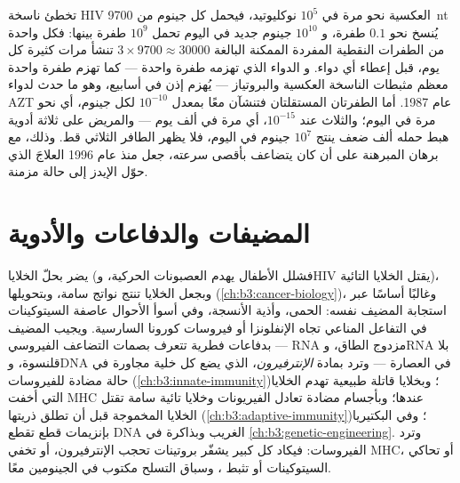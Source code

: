 \begin{example}\label{ex:b3:virology:three-drugs}
تخطئ ناسخة HIV العكسية نحو مرة في $10^{5}$ نوكليوتيد، فيحمل
كل جينوم من \qty{9700}{nt} يُنسخ نحو $0.1$ طفرة، و
$10^{10}$ جينوم جديد في اليوم تحمل $10^{9}$ طفرة بينها: فكل
واحدة من الطفرات النقطية المفردة الممكنة البالغة $3\times 9700 \approx \num{30000}$
تنشأ مرات كثيرة كل يوم، قبل إعطاء أي دواء. و
الدواء الذي تهزمه طفرة واحدة --- كما تهزم طفرة واحدة معظم
مثبطات الناسخة العكسية والبروتياز --- يُهزم إذن
في أسابيع، وهو ما حدث لدواء AZT عام 1987. أما الطفرتان المستقلتان
فتنشآن معًا بمعدل $10^{-10}$ لكل جينوم، أي نحو مرة في اليوم؛
والثلاث عند $10^{-15}$، أي مرة في ألف يوم --- والمريض على ثلاثة
أدوية هبط حمله ألف ضعف ينتج $10^{7}$ جينوم في
اليوم، فلا يظهر الطافر الثلاثي قط. وذلك، مع
برهان المبرهنة على أن  كان يتضاعف بأقصى سرعته، جعل
 منذ عام 1996 العلاجَ الذي حوّل الإيدز إلى
حالة مزمنة.
\end{example}

\section{المضيفات والدفاعات والأدوية}

\begin{proposition}\label{prop:b3:virology:pathogenesis}
يضر  بحلّ الخلايا (فشلل الأطفال يهدم العصبونات الحركية، وHIV يقتل
الخلايا التائية)، وبجعل الخلايا تنتج نواتج سامة، وبتحويلها
(\cref{ch:b3:cancer-biology})، وغالبًا أساسًا عبر استجابة
المضيف نفسه: الحمى، وأذية الأنسجة، وفي أسوأ الأحوال عاصفة السيتوكينات في
التفاعل المناعي تجاه الإنفلونزا أو فيروسات كورونا السارسية. ويجيب المضيف
بدفاعات فطرية تتعرف بصمات التضاعف
الفيروسي --- RNA مزدوج الطاق، وRNA بلا قلنسوة، وDNA في
العصارة --- وترد بمادة \emph{الإنترفيرون}، الذي يضع كل
خلية مجاورة في حالة مضادة للفيروسات (\cref{ch:b3:innate-immunity})؛
وبخلايا قاتلة طبيعية تهدم الخلايا التي أخفت MHC عندها؛
وبأجسام مضادة تعادل الفيريونات وخلايا تائية سامة تقتل
الخلايا المخموجة قبل أن تطلق ذريتها (\cref{ch:b3:adaptive-immunity})؛
وفي البكتيريا بإنزيمات قطع تقطع DNA الغريب وبذاكرة
 في \cref{ch:b3:genetic-engineering}. وترد الفيروسات:
فيكاد كل  كبير يشفّر بروتينات تحجب الإنترفيرون، أو تخفي
MHC، أو تحاكي السيتوكينات أو تثبط ، وسباق التسلح
مكتوب في الجينومين معًا.
\end{proposition}

